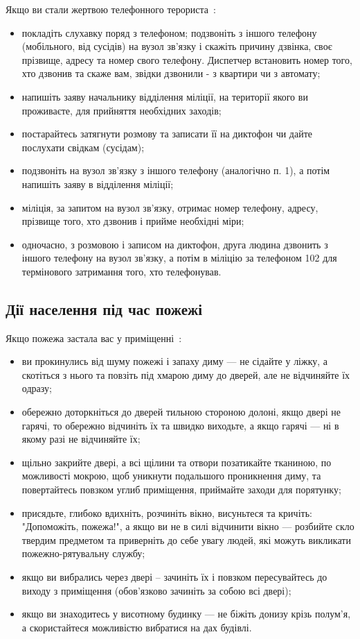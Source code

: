 Якщо ви стали жертвою телефонного терориста~\cite{cherkass}:
\begin{itemize}
	\item покладіть слухавку поряд з телефоном; подзвоніть з іншого телефону (мобільного, від сусідів) на вузол зв'язку і скажіть причину дзвінка, своє прізвище, адресу та номер свого телефону. Диспетчер встановить номер того, хто дзвонив та скаже вам, звідки дзвонили - з квартири чи з автомату;
	\item напишіть заяву начальнику відділення міліції, на території якого ви проживаєте, для прийняття необхідних заходів;
	\item постарайтесь затягнути розмову та записати її на диктофон чи дайте послухати свідкам (сусідам);
	\item подзвоніть на вузол зв'язку з іншого телефону (аналогічно п. 1), а потім напишіть заяву в відділення міліції;
	\item міліція, за запитом на вузол зв'язку, отримає номер телефону, адресу, прізвище того, хто дзвонив і прийме необхідні міри;
	\item одночасно, з розмовою і записом на диктофон, друга людина дзвонить з іншого телефону на вузол зв'язку, а потім в міліцію за телефоном 102 для термінового затримання того, хто телефонував.
\end{itemize}

\subsection*{Дії населення під час пожежі}
Якщо пожежа застала вас у приміщенні~\cite{iFrank}:
\begin{itemize}
	\item ви прокинулись від шуму пожежі і запаху диму --- не сідайте у ліжку, а скотіться з нього та повзіть під хмарою диму до дверей, але не відчиняйте їх одразу;
	\item обережно доторкніться до дверей тильною стороною долоні,
	якщо двері не гарячі, то обережно відчиніть їх та швидко виходьте, а якщо
	гарячі --- ні в якому разі не відчиняйте їх;
	\item щільно закрийте двері, а всі щілини та отвори позатикайте
	тканиною, по можливості мокрою, щоб уникнути подальшого проникнення
	диму, та повертайтесь повзком углиб приміщення, приймайте заходи для
	порятунку;
	\item присядьте, глибоко вдихніть, розчиніть вікно, висуньтеся та
	кричіть: "Допоможіть, пожежа!", а якщо ви не в силі відчинити вікно ---
	розбийте скло твердим предметом та приверніть до себе увагу людей, які
	можуть викликати пожежно-рятувальну службу;
	\item якщо ви вибрались через двері – зачиніть їх і повзком
	пересувайтесь до виходу з приміщення (обов’язково зачиніть за собою всі
	двері);
	\item якщо ви знаходитесь у висотному будинку --- не біжіть донизу
	крізь полум’я, а скористайтеся можливістю вибратися на дах будівлі.
\end{itemize}

